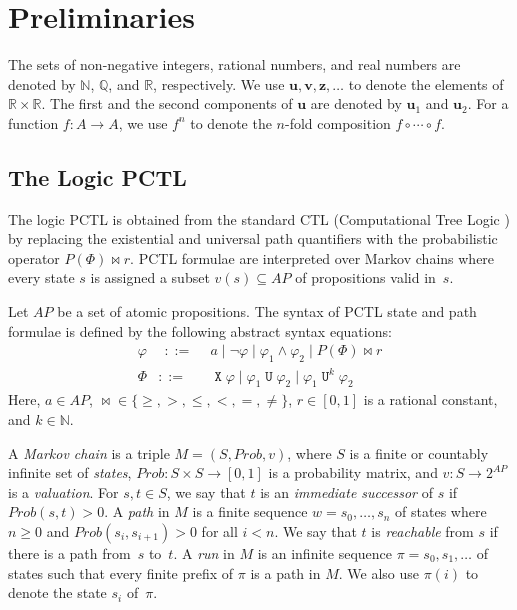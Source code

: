\documentclass[a4paper,UKenglish,cleveref, autoref, thm-restate]{lipics-v2021}
\newcommand{\N}{\mathbb{N}}
\newcommand{\R}{\mathbb{R}}
\newcommand{\Q}{\mathbb{Q}}
\newcommand{\AP}{\textit{AP}}
\newcommand{\Prob}{\mathit{Prob}}
\renewcommand{\vec}[1]{\pmb{#1}}
\newcommand*{\vp}{\varphi}
\newcommand*{\opx}{\operatorname{\pmb{\mathtt{X}}}}
\newcommand*{\opu}{\operatorname{\pmb{\mathtt{U}}}}
\begin{document}
 \section{Preliminaries}
\label{sec-prelim}

The sets of non-negative integers, rational numbers, and real numbers are denoted by $\N$, $\Q$, and $\R$, respectively. 
We use $\vec{u},\vec{v},\vec{z},\ldots$ to denote the elements of $\R \times \R$. The first and the second components of $\vec{u}$ are denoted by $\vec{u}_1$ and $\vec{u}_2$. For a function $f : A \to A$, we use $f^n$ to denote the $n$-fold composition $f \circ \cdots \circ f$.



\subsection{The Logic PCTL}
The logic PCTL \cite{HJ:logic-time-probability-FAC} is obtained from the standard CTL (Computational Tree Logic \cite{Emerson:temp-logic-handbook}) by replacing the existential and universal path quantifiers with the probabilistic operator $P(\Phi) \bowtie r$. PCTL formulae are interpreted over Markov chains where every state $s$ is assigned a subset $v(s) \subseteq \AP$ of propositions valid in~$s$.


\begin{definition}[PCTL]
\label{def-pctl}
   Let $\AP$ be a set of atomic propositions. The syntax of PCTL state and path formulae is defined by the following abstract syntax equations:
\[
   \begin{array}{lcl}
      \varphi & ~~::=~~ & a \mid \neg \vp \mid \vp_1 \wedge \vp_2 \mid P(\Phi) \bowtie r\\
      \Phi & ::= &\opx \vp \mid \vp_1 \opu \varphi_2 \mid \vp_1 \opu^{k} \varphi_2
   \end{array} 
   \]    
   Here, $a \in \AP$, ${\bowtie} \in \{{\geq}, {>}, {\leq},{<},{=},{\neq}\}$, $r \in [0,1]$ is a rational constant, and $k \in \N$.
\end{definition}



A \emph{Markov chain} is a triple $M = (S,\Prob,v)$, where $S$ is a finite or countably infinite set of \emph{states}, \mbox{$\Prob \colon S \times S \rightarrow [0,1]$} is a probability matrix, 
and \mbox{$v \colon S \rightarrow 2^{\AP}$} is a \emph{valuation}. 
For $s,t \in S$, we say that $t$ is an \emph{immediate successor} of $s$ if \mbox{$\Prob(s,t) > 0$}.
A \emph{path} in $M$ is a finite sequence $w = s_0, \ldots ,s_n$ of states where $n \geq 0$ and 
\mbox{$\Prob(s_i,s_{i+1}) > 0$} for all $i <n$. We say that $t$ is \emph{reachable} from $s$ if there is a path from~$s$ to~$t$.
A \emph{run} in $M$ is an infinite sequence $\pi = s_0, s_1, \ldots$ of states such that every finite prefix of $\pi$ is a path in $M$. We also use $\pi(i)$ to denote the state $s_i$ of~$\pi$. 
 
\end{document}
